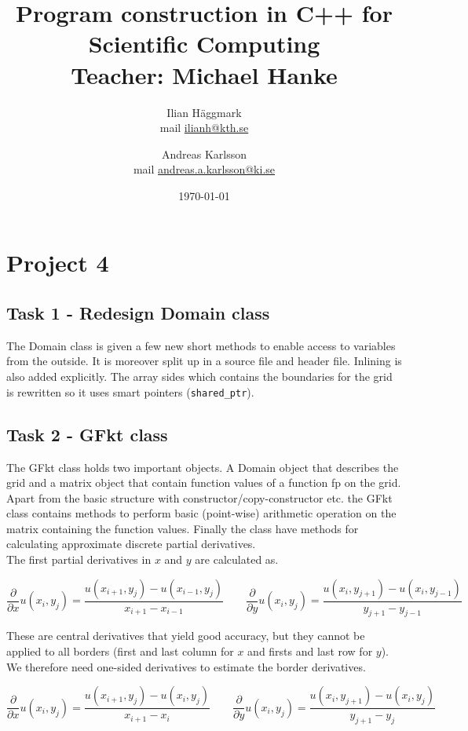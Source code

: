 \documentclass[paper=a4, fontsize=12pt]{article} %
\title{Program construction in C++ for Scientific Computing \\ Teacher: Michael Hanke}
\author{Ilian H{\"a}ggmark \\ mail \href{mailto:ilianh@kth.se}{ilianh@kth.se}
  \and Andreas Karlsson \\ mail \href{mailto:andreas.a.karlsson@ki.se}{andreas.a.karlsson@ki.se} }
\date{\normalsize\today} %
\begin{document}
\maketitle %

\section*{Project 4}
\subsection*{Task 1 - Redesign Domain class}

The Domain class is given a few new short methods to enable access to variables from the outside. It is moreover split up in a source file and header file. Inlining is also added explicitly. The array sides which contains the boundaries for the grid is rewritten so it uses smart pointers (\texttt{shared\_ptr}). 

\subsection*{Task 2 - GFkt class}

The GFkt class holds two important objects. A Domain object that describes the grid and a matrix object that contain function values of a function fp on the grid. Apart from the basic structure with constructor/copy-constructor etc. the GFkt class contains methods to perform basic (point-wise) arithmetic operation on the matrix containing the function values. Finally the class have methods for calculating approximate discrete partial derivatives. \\

The first partial derivatives in $x$ and $y$ are calculated as.

$$ \frac{\partial}{\partial x} u(x_i,y_j)  = \frac{u(x_{i+1},y_j)-u(x_{i-1},y_j)}{x_{i+1} - x_{i-1}} \qquad  \frac{\partial}{\partial y} u(x_i,y_j)  = \frac{u(x_{i},y_{j+1})-u(x_{i},y_{j-1})}{y_{j+1} - y_{j-1}}$$

These are central derivatives that yield good accuracy, but they cannot be applied to all borders (first and last column for $x$ and firsts and last row for $y$). We therefore need one-sided derivatives to estimate the border derivatives.

$$ \frac{\partial}{\partial x} u(x_i,y_j)  = \frac{u(x_{i+1},y_j)-u(x_{i},y_j)}{x_{i+1} - x_{i}} \qquad  \frac{\partial}{\partial y} u(x_i,y_j)  = \frac{u(x_{i},y_{j+1})-u(x_{i},y_{j})}{y_{j+1} - y_{j}}$$
\end{document}
